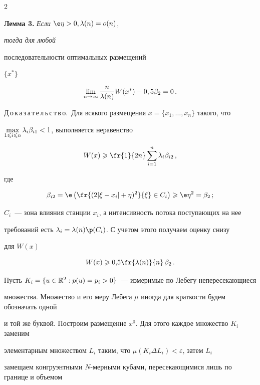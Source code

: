 \begin{multicols}{2}
\noindent


\textbf{Лемма 3.} {\it Если} ${\e} \eta > 0, \lambda(n)=o(n)$, {\it тогда для любой


последовательности оптимальных размещений} $\{x^*\}$


$$


\liml{n\rightarrow\infty}\frac{n}{\lambda(n)}W(x^*)-0,5\beta_2=0\,.


$$





Д\,о\,к\,а\,з\,а\,т\,е\,л\,ь\,с\,т\,в\,о.~Для всякого размещения $x=\{x_1,\ldots,x_n\}$ такого, что


$\max\limits_{1\leqslant i\leqslant n} \lambda_i \beta_{i1}< 1 $, выполняется неравенство


$$ %


W(x)\geqslant \fr{1}{2n}\suml{i=1}{n}\lambda_i \beta_{i2}\,,


$$


где


$$


\beta_{i2}=


{\e}\left ( \fr{ (2|\xi-x_i|+\eta)^2}{\xi}\in C_i\right )\geqslant \e\eta^2=\beta_2\,;


$$


$C_i$~--- зона влияния станции $x_i$, а интенсивность потока поступающих на нее


требований есть $\lambda_i=\lambda(n) {\p} (C_i)$. С учетом этого получаем оценку снизу


для $W(x)$


$$


W(x)\geqslant 0{,}5\fr{\lambda(n)}{n}\,\beta_2\,.


$$





Пусть $K_i=\{u\in {\mathbb {R}}^2: p(u)=p_i>0 \}$~--- измеримые по Лебегу непересекающиеся


множества. Множество и его меру Лебега $\mu$ иногда для краткости будем обозначать одной


и той же бук\-вой. Построим размещение $x^0$. Для этого каждое множество $K_i$ заменим


элементарным множеством $L_i$ таким, что $\mu(K_i \Delta L_i)<\varepsilon $, затем $L_i$


замещаем конгруэнтными $N$-мерными кубами, пе\-ре\-се\-ка\-ющи\-ми\-ся лишь по границе и объемом



\end{multicols}

